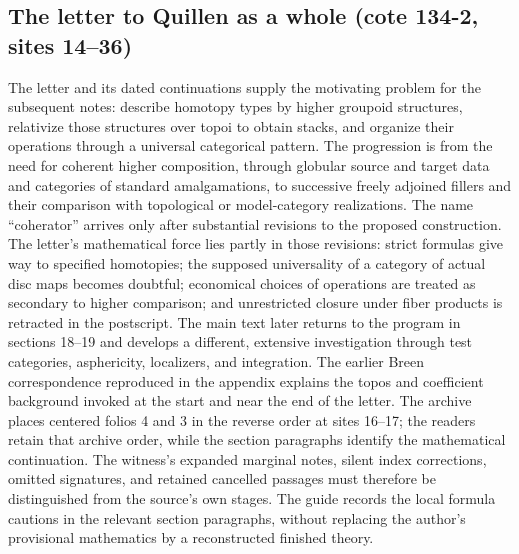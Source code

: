 \subsection*{The letter to Quillen as a whole (cote 134-2, sites 14--36)}
The letter and its dated continuations supply the motivating problem for the subsequent notes: describe homotopy types by higher groupoid structures, relativize those structures over topoi to obtain stacks, and organize their operations through a universal categorical pattern. The progression is from the need for coherent higher composition, through globular source and target data and categories of standard amalgamations, to successive freely adjoined fillers and their comparison with topological or model-category realizations. The name ``coherator'' arrives only after substantial revisions to the proposed construction. The letter's mathematical force lies partly in those revisions: strict formulas give way to specified homotopies; the supposed universality of a category of actual disc maps becomes doubtful; economical choices of operations are treated as secondary to higher comparison; and unrestricted closure under fiber products is retracted in the postscript. The main text later returns to the program in sections 18--19 and develops a different, extensive investigation through test categories, asphericity, localizers, and integration. The earlier Breen correspondence reproduced in the appendix explains the topos and coefficient background invoked at the start and near the end of the letter. The archive places centered folios 4 and 3 in the reverse order at sites 16--17; the readers retain that archive order, while the section paragraphs identify the mathematical continuation. The witness's expanded marginal notes, silent index corrections, omitted signatures, and retained cancelled passages must therefore be distinguished from the source's own stages. The guide records the local formula cautions in the relevant section paragraphs, without replacing the author's provisional mathematics by a reconstructed finished theory.
